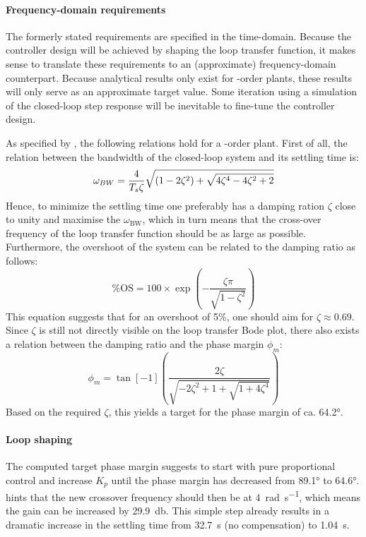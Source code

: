\paragraph{Frequency-domain requirements}
The formerly stated requirements are specified in the time-domain. Because the controller design will be achieved by shaping the loop transfer function, it makes sense to translate these requirements to an (approximate) frequency-domain counterpart. Because analytical results only exist for -order plants, these results will only serve as an approximate target value. Some iteration using a simulation of the closed-loop step response will be inevitable to fine-tune the controller design.

As specified by \textcite{nise}, the following relations hold for a -order plant. First of all, the relation between the bandwidth of the closed-loop system and its settling time is:
$$\omega_{BW} = \frac{4}{T_s\zeta}\sqrt{\qty(1 - 2\zeta^2)+\sqrt{4
\zeta^4-4\zeta^2+2}}$$
Hence, to minimize the settling time one preferably has a damping ration $\zeta$ close to unity and maximise the $\omega_\text{BW}$, which in turn means that the cross-over frequency of the loop transfer function should be as large as possible. Furthermore, the overshoot of the system can be related to the damping ratio as follows:
\begin{equation}
\%\text{OS} = 100\times \exp(-\frac{\zeta \pi}{\sqrt{1-\zeta^2}})
\label{eq:overshoot}    
\end{equation}
This equation suggests that for an overshoot of 5\%, one should aim for $\zeta \approx 0.69$.
Since $\zeta$ is still not directly visible on the loop transfer Bode plot, there also exists a relation between the damping ratio and the phase margin $\phi_m$:
\begin{equation}
\phi_m = \tan[-1](\frac{2\zeta}{\sqrt{-2\zeta^2 + 1 + \sqrt{1 + 4\zeta^4}}})
\label{eq:settlingtime}    
\end{equation}
Based on the required $\zeta$, this yields a target for the phase margin of ca. \ang{64.2}.

\paragraph{Loop shaping}
The computed target phase margin suggests to start with pure proportional control and increase $K_p$ until the phase margin has decreased from \ang{89.1} to \ang{64.6}.  hints that the new crossover frequency should then be at \SI{4}{\radian\per\second}, which means the gain can be increased by \SI{29.9}{\decibel}. This simple step already results in a dramatic increase in the settling time from \SI{32.7}{\second} (no compensation) to \SI{1.04}{\second}. 

